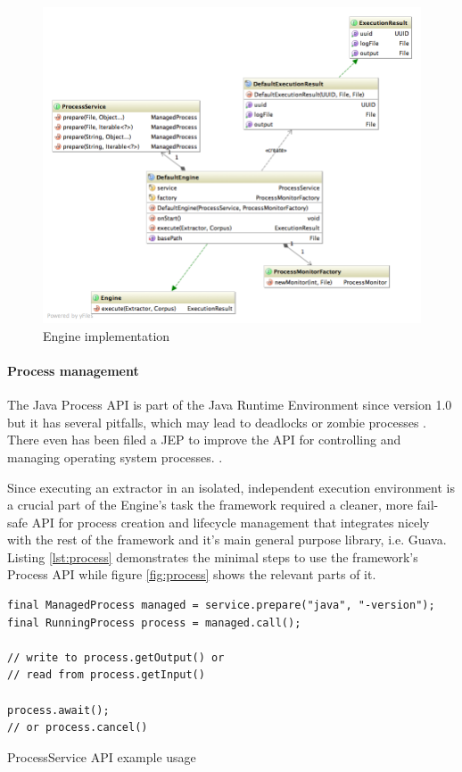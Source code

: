 \begin{figure}[H]
\centering
\includegraphics[width=\textwidth, trim=20px 20px 0 0, clip=true]{execution.png}
\caption{Engine implementation}
\end{figure}

\newpage
\paragraph{Process management}
The Java Process API is part of the Java Runtime Environment since version 1.0 but it has several  pitfalls, which may lead to deadlocks or zombie processes \cite{Cartmell:2009}. There even has been filed a \gls{JEP} to improve the API for controlling and managing operating system processes. \cite{JEP:102}.

Since executing an extractor in an isolated, independent execution environment is a crucial part of the Engine's task the framework required a cleaner, more fail-safe API for process creation and lifecycle management that integrates nicely with the rest of the framework and it's main general purpose library, i.e. Guava. Listing \ref{lst:process} demonstrates the minimal steps to use the  framework's Process API while figure \ref{fig:process} shows the relevant parts of it.

\begin{listing}[H]
\begin{verbatim}
final ManagedProcess managed = service.prepare("java", "-version");
final RunningProcess process = managed.call();

// write to process.getOutput() or
// read from process.getInput()

process.await();
// or process.cancel()
\end{verbatim}
\caption{ProcessService API example usage}
\label{lst:process}
\end{listing}

